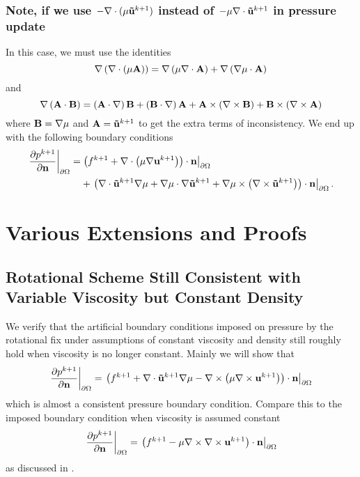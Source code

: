 \documentclass[letterpaper]{erdc}
\begin{document}
\subsection{Note, if we use $-\nabla\cdot(\mu\mathbf{\tilde{u}}^{k+1})$ instead of $-\mu\nabla\cdot\mathbf{\tilde{u}}^{k+1}$ in pressure update}
In this case, we must use the identities
\begin{equation}
    \nabla\left( \nabla\cdot\left( \mu \mathbf{A}\right) \right) = \nabla\left(\mu\nabla\cdot\mathbf{A}\right) + \nabla\left( \nabla\mu\cdot\mathbf{A} \right)
\end{equation}
and 
\begin{equation}
  \nabla\left(\mathbf{A}\cdot \mathbf{B}\right) = \left( \mathbf{A}\cdot\nabla\right)\mathbf{B} + \left( \mathbf{B}\cdot\nabla\right)\mathbf{A} + \mathbf{A}\times\left(\nabla\times\mathbf{B}\right) + \mathbf{B}\times\left(\nabla\times\mathbf{A}\right)
\end{equation}
  where $\mathbf{B} = \nabla\mu$ and $\mathbf{A} = \mathbf{\tilde{u}}^{k+1}$ to get the extra terms of inconsistency.  We end up with the following boundary conditions
\begin{equation}
  \begin{split}\left.\frac{\partial p^{k+1}}{\partial \textbf{n}}\right|_{\partial\Omega} = &\left.\left(f^{k+1} + \nabla\cdot\left(\mu\nabla\textbf{u}^{k+1}\right) \right)\cdot \textbf{n}\right|_{\partial\Omega}\\ &+ \left.\left(\nabla\cdot\mathbf{\tilde{u}}^{k+1}\nabla\mu  + \nabla\mu\cdot\nabla\mathbf{\tilde{u}}^{k+1} + \nabla\mu\times\left( \nabla\times\mathbf{\tilde{u}}^{k+1}\right) \right)\cdot\textbf{n}\right|_{\partial\Omega}. \end{split}
\end{equation}



\appendix
\chapter{Various Extensions and Proofs}

\section{Rotational Scheme Still Consistent with Variable Viscosity but Constant Density}
We verify that the artificial boundary conditions imposed on pressure by the rotational fix under assumptions of constant viscosity and density still roughly hold when viscosity is no longer constant.  Mainly we will show that 
\begin{equation}
  \left.\frac{\partial p^{k+1}}{\partial \textbf{n}}\right|_{\partial\Omega} = \left.\left(f^{k+1} + \nabla\cdot\mathbf{\tilde{u}}^{k+1}\nabla\mu - \nabla\times\left(\mu\nabla\times \textbf{u}^{k+1}  \right)  \right)\cdot \textbf{n}\right|_{\partial\Omega}
\end{equation}
which is almost a consistent pressure boundary condition.  Compare this to the imposed boundary condition when viscosity is assumed constant
\begin{equation}
  \left.\frac{\partial p^{k+1}}{\partial \textbf{n}}\right|_{\partial\Omega} = \left.\left(f^{k+1} - \mu\nabla\times\nabla\times \textbf{u}^{k+1} \right)\cdot \textbf{n}\right|_{\partial\Omega}
\end{equation}
 as discussed in \cite{guermond2004error}.  
 
\end{document}
